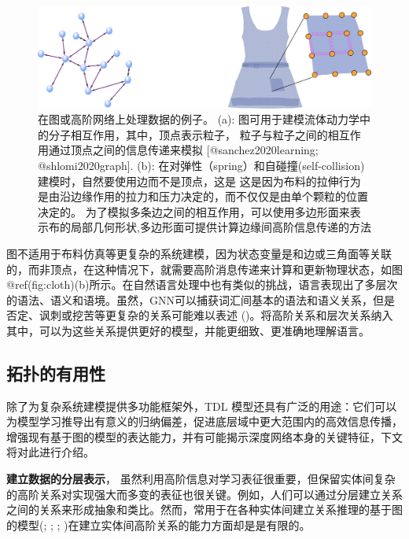 \documentclass[
  12pt,
]{krantz}
\begin{document}
\begin{figure}

{\centering \includegraphics{figures/cloth} 

}

\caption{在图或高阶网络上处理数据的例子。 (a): 图可用于建模流体动力学中的分子相互作用，其中，顶点表示粒子， 粒子与粒子之间的相互作用通过顶点之间的信息传递来模拟  [@sanchez2020learning; @shlomi2020graph]. (b): 在对弹性（spring）和自碰撞(self-collision)建模时，自然要使用边而不是顶点，这是 这是因为布料的拉伸行为是由沿边缘作用的拉力和压力决定的，而不仅仅是由单个颗粒的位置决定的。 为了模拟多条边之间的相互作用，可以使用多边形面来表示布的局部几何形状,多边形面可提供计算边缘间高阶信息传递的方法}\label{fig:cloth}
\end{figure}

图不适用于布料仿真等更复杂的系统建模，因为状态变量是和边或三角面等关联的，而非顶点，在这种情况下，就需要高阶消息传递来计算和更新物理状态，如图@ref(fig:cloth)(b)所示。在自然语言处理中也有类似的挑战，语言表现出了多层次的语法、语义和语境。虽然，GNN可以捕获词汇间基本的语法和语义关系，但是否定、讽刺或挖苦等更复杂的关系可能难以表述
()。将高阶关系和层次关系纳入其中，可以为这些关系提供更好的模型，并能更细致、更准确地理解语言。

\subsection{拓扑的有用性}\label{the-utility-of-topology}

除了为复杂系统建模提供多功能框架外，TDL
模型还具有广泛的用途：它们可以为模型学习推导出有意义的归纳偏差，促进底层域中更大范围内的高效信息传播，增强现有基于图的模型的表达能力，并有可能揭示深度网络本身的关键特征，下文将对此进行介绍。

\textbf{建立数据的分层表示}，
虽然利用高阶信息对学习表征很重要，但保留实体间复杂的高阶关系对实现强大而多变的表征也很关键。例如，人们可以通过分层建立关系之间的关系来形成抽象和类比。然而，常用于在各种实体间建立关系推理的基于图的模型(; ; ;
)在建立实体间高阶关系的能力方面却是是有限的。
\end{document}
